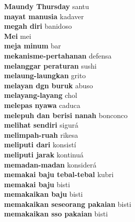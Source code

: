 \textbf{ Maundy Thursday  } santu \\
\textbf{ mayat manusia  } kadaver \\
\textbf{ megah diri  } banidoso \\
\textbf{ Mei  } mei \\
\textbf{ meja minum  } bar \\
\textbf{ mekanisme-pertahanan  } defensa \\
\textbf{ melanggar peraturan  } sushi \\
\textbf{ melaung-laungkan  } grito \\
\textbf{ melayan dgn buruk  } abuso \\
\textbf{ melayang-layang  } chol \\
\textbf{ melepas nyawa  } caduca \\
\textbf{ melepuh dan berisi nanah  } bonconco \\
\textbf{ melihat sendiri  } sigurá \\
\textbf{ melimpah-ruah  } rikesa \\
\textbf{ meliputi dari  } konsistí \\
\textbf{ meliputi jarak  } kontinuá \\
\textbf{ memadan-madan  } konsiderá \\
\textbf{ memakai baju tebal-tebal  } kubri \\
\textbf{ memakai baju  } bisti \\
\textbf{ memakaikan baju  } bisti \\
\textbf{ memakaikan seseorang pakaian  } bisti \\
\textbf{ memakaikan sso pakaian  } bisti \\
